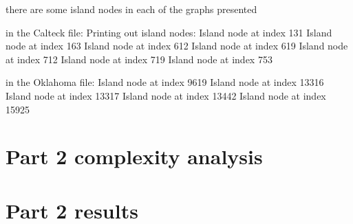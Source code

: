 \documentclass{article}
\begin{document}
there are some island nodes in each of the graphs presented

in the Calteck file:
Printing out island nodes:
Island node at index 131
Island node at index 163
Island node at index 612
Island node at index 619
Island node at index 712
Island node at index 719
Island node at index 753

in the Oklahoma file:
Island node at index 9619
Island node at index 13316
Island node at index 13317
Island node at index 13442
Island node at index 15925


\section{Part 2 complexity analysis}
\label{sec:complexity2}


\section{Part 2 results}
\label{sec:part2}
\end{document}
